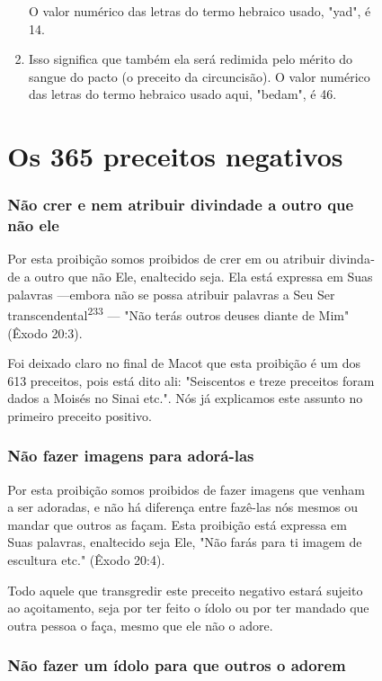\begin{itemize}
\begin{enumrate}
\begin{itemize}
\begin{itemize}
\begin{itemize}
\begin{enumerate}
 O valor numérico das letras do termo hebraico usado, "yad", é 14.
 
\item
 
 Isso significa que também ela será redimida pelo mérito do sangue do
 pacto (o preceito da circuncisão). O valor numérico das letras do
 termo hebraico usado aqui, "bedam", é 46.
 
\end{enumerate}


\part{Os 365 preceitos negativos}



\section{Não crer e nem atribuir divindade a outro que não ele}

Por esta proibição somos proibidos de crer em ou atribuir divinda­de a
outro que não Ele, enaltecido seja. Ela está expressa em Suas palavras
---embora não se possa atribuir palavras a Seu Ser
transcendental\textsuperscript{233} --- "Não te­rás outros deuses diante
de Mim" (Êxodo 20:3).

Foi deixado claro no final de Macot que esta proibição é um dos 613
preceitos, pois está dito ali: "Seiscentos e treze preceitos foram dados
a Moisés no Sinai etc.". Nós já explicamos este assunto no primeiro
preceito positivo.

\section{Não fazer imagens para adorá-las}

Por esta proibição somos proibidos de fazer imagens que venham a ser
adoradas, e não há diferença entre fazê-las nós mesmos ou mandar que
outros as façam. Esta proibição está expressa em Suas palavras,
enaltecido seja Ele, "Não farás para ti imagem de escultura etc." (Êxodo
20:4).

Todo aquele que transgredir este preceito negativo estará sujeito ao
açoitamento, seja por ter feito o ídolo ou por ter mandado que outra
pessoa o faça, mesmo que ele não o adore.

\section{Não fazer um ídolo para que outros o adorem}


\end{itemize}
\end{itemize}
\end{itemize}
\end{enumrate}
\end{itemize}
